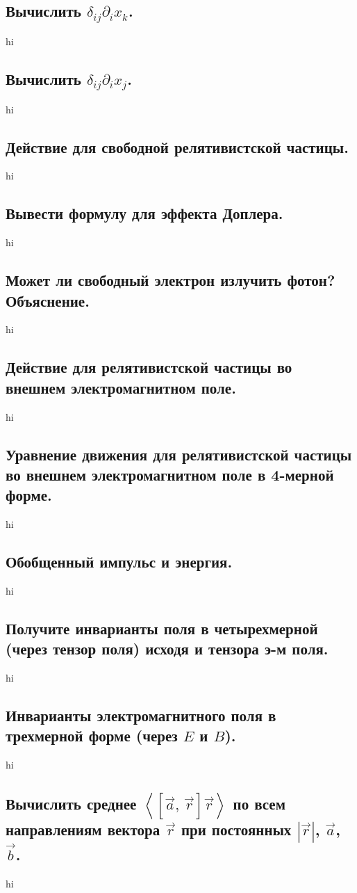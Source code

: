 \documentclass[a4paper,12pt]{article}
\begin{document}
\subsection{Вычислить $\delta_{ij}\partial_i x_k$.}
hi
\subsection{Вычислить $\delta_{ij}\partial_i x_j$.}
hi
\subsection{Действие для свободной релятивистской частицы.}
hi
\subsection{Вывести формулу для эффекта Доплера.}
hi
\subsection{Может ли свободный электрон излучить фотон? Объяснение.}
hi
\subsection{Действие для релятивистской частицы во внешнем электромагнитном
поле.}
hi
\subsection{Уравнение движения для релятивистской частицы во внешнем
электромагнитном поле в 4-мерной форме.}
hi
\subsection{Обобщенный импульс и энергия.}
hi
\subsection{Получите инварианты поля в четырехмерной (через тензор поля)
исходя и тензора э-м поля.}
hi
\subsection{Инварианты электромагнитного поля в трехмерной форме (через $E$ и
$B$).}
hi
\subsection{Вычислить среднее $\left<\left[ \vec{a},\,\vec{r} \right] \vec{r}
\right>$ по всем направлениям вектора $\vec{r}$ при постоянных  $\left| 
\vec{r}\right| $, $\vec{a}$, $\vec{b}$.}
hi
\end{document}
